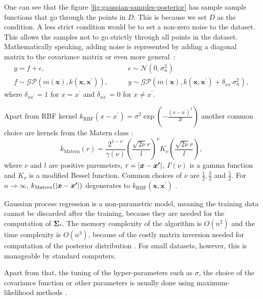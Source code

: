 One can see that the figure \ref{fig:gaussian-samples-posterior} has sample sample functions that go through the points in $D$. This is because we set $D$ as the condition. A less strict condition would be to set a non-zero noise to the dataset. This allows the samples not to go strictly through all points in the dataset. Mathematically speaking, adding noise is represented by adding a diagonal matrix to the covariance matrix or even more general~\cite{rasmussen2004}:
\begin{equation}
	\begin{split}
		y = f + \epsilon,& \quad  \quad \epsilon \sim \mathcal{N}(0, \sigma_n^2) \\
		f \sim \mathcal{GP}(m(\bm{x}),k(\bm{x},\bm{x}^\prime)), & \quad  \quad y \sim \mathcal{GP}(m(\bm{x}),k(\bm{x},\bm{x}^\prime)+\delta_{xx^\prime}\sigma_n^2),
	\end{split}
\end{equation}
where $\delta_{xx^\prime} = 1$ for $x=x^\prime$ and $\delta_{xx^\prime} = 0$ for $x\neq x^\prime$.

Apart from RBF kernel $k_{\mathrm{RBF}}(x-x^\prime) =\sigma^2\exp(-\frac{(x-x^\prime)^2}{2l})$ another common choice are kernels from the Matern class \cite{rasmussen2005}:
\begin{equation}
	k_\mathrm{Matern}(r) = \frac{2^{1-\nu}}{\gamma(\nu)}\left(\frac{\sqrt{2\nu}r}{l}\right)^\nu K_\nu\left(\frac{\sqrt{2\nu}r}{l}\right),
\end{equation}
where $\nu$ and $l$ are positive paremeters, $r=\lvert \bm{x} -\bm{x^\prime} \rvert$, $\Gamma(\nu)$ is a gamma function and $K_\nu$ is a modified Bessel function. Common choices of $\nu$ are $\frac{1}{2}, \frac{3}{2}$ and $\frac{5}{2}$. For $n \rightarrow \infty$, $k_\mathrm{Matern}(\lvert \bm{x} -\bm{x^\prime} \rvert)$ degenerates to $k_{\mathrm{RBF}}(\bm{x} ,\bm{x^\prime})$ \cite{rasmussen2005}.

Gaussian process regression is a non-parametric model, meaning the training data cannot be discarded after the training, because they are needed for the computation of $\bm{\Sigma_*}$. The memory complexity of the algorithm is $O(n^2)$ and the time complexity is $O(n^3)$, because of the costly matrix inversion needed for computation of the posterior distribution \cite{rasmussen2004}. For small datasets, however, this is manageable by standard computers.

Apart from that, the tuning of the hyper-parameters such as $\sigma$, the choice of the covariance function or other parameters is usually done using maximum-likelihood methods \cite{rasmussen2004}.

